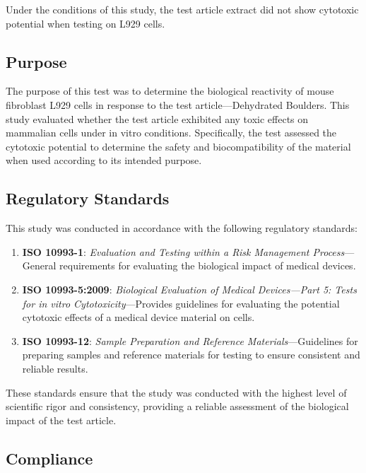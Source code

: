 \documentclass[
  12pt,
]{article}
\providecommand{\tightlist}{%
  \setlength{\itemsep}{0pt}\setlength{\parskip}{0pt}}
\begin{document}
Under the conditions of this study, the test article extract did not
show cytotoxic potential when testing on L929 cells.

\newpage

\subsection{Purpose}\label{purpose}

The purpose of this test was to determine the biological reactivity of
mouse fibroblast L929 cells in response to the test article---Dehydrated
Boulders. This study evaluated whether the test article exhibited any
toxic effects on mammalian cells under in vitro conditions.
Specifically, the test assessed the cytotoxic potential to determine the
safety and biocompatibility of the material when used according to its
intended purpose.

\subsection{Regulatory Standards}\label{regulatory-standards}

This study was conducted in accordance with the following regulatory
standards:

\begin{enumerate}
\def\labelenumi{\arabic{enumi}.}
\tightlist
\item
  \textbf{ISO 10993-1}: \emph{Evaluation and Testing within a Risk
  Management Process}---General requirements for evaluating the
  biological impact of medical devices.\\
\item
  \textbf{ISO 10993-5:2009}: \emph{Biological Evaluation of Medical
  Devices---Part 5: Tests for in vitro Cytotoxicity}---Provides
  guidelines for evaluating the potential cytotoxic effects of a medical
  device material on cells.\\
\item
  \textbf{ISO 10993-12}: \emph{Sample Preparation and Reference
  Materials}---Guidelines for preparing samples and reference materials
  for testing to ensure consistent and reliable results.
\end{enumerate}

These standards ensure that the study was conducted with the highest
level of scientific rigor and consistency, providing a reliable
assessment of the biological impact of the test article.

\subsection{Compliance}\label{compliance}
\end{document}
